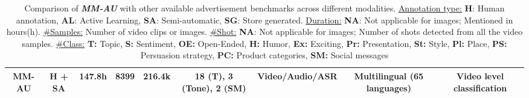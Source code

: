 \begin{table}[h!]
{\begin{tabular}{|c|c|c|c|c|c|c|c|c|}
\textbf{MM-AU}         & \textbf{H + SA}          & \textbf{147.8h}   & \textbf{8399}      & \textbf{216.4k} & \textbf{18 (T), 3 (Tone), 2 (SM)}    & \textbf{Video/Audio/ASR} & \textbf{Multilingual (65 languages)} & \textbf{Video level classification} \\ \hline
\end{tabular}
}
\vspace{5mm}
\caption{Comparison of \textbf{\textit{MM-AU}} with other available advertisement benchmarks across different modalities.  \underline{Annotation type:} \textbf{H}: Human annotation, \textbf{AL}: Active Learning, \textbf{SA}: Semi-automatic, \textbf{SG}: Store generated. \underline{Duration:} \textbf{NA}: Not applicable for images; Mentioned in hours(h). \underline{\#Samples:} Number of video clips or images. \underline{\#Shot:} \textbf{NA}: Not applicable for images; Number of shots detected from all the video samples. \underline{\#Class:} \textbf{T:} Topic, \textbf{S:} Sentiment, \textbf{OE:} Open-Ended, \textbf{H:} Humor, \textbf{Ex:} Exciting, \textbf{Pr:} Presentation, \textbf{St:} Style, \textbf{Pl:} Place, \textbf{PS:} Persuasion strategy, \textbf{PC:} Product categories, \textbf{SM:} Social messages}
\label{Overview_ads}
\end{table}

